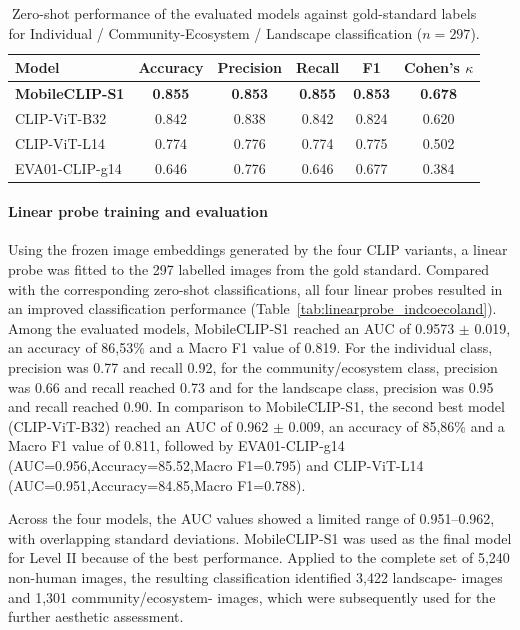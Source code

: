 \documentclass[11pt]{article}
\renewcommand{\_}{\textunderscore\allowbreak{}}
\begin{document}
\begin{table}[htbp]
\centering
\caption{Zero-shot performance of the evaluated models against gold-standard labels for Individual / Community-Ecosystem / Landscape classification ($n=297$).}
\label{tab:gold_standard_validation_indcoecoland}
\begin{tabular}{@{}lccccc@{}}
\toprule
\textbf{Model} & \textbf{Accuracy} & \textbf{Precision} & \textbf{Recall} & \textbf{F1} & \textbf{Cohen's $\kappa$} \\
\midrule
\textbf{MobileCLIP-S1}    & \textbf{0.855} & \textbf{0.853} & \textbf{0.855} & \textbf{0.853} & \textbf{0.678} \\
CLIP-ViT-B32               & 0.842 & 0.838 & 0.842 & 0.824 & 0.620 \\
CLIP-ViT-L14                & 0.774 & 0.776 & 0.774 & 0.775 & 0.502 \\
EVA01-CLIP-g14              & 0.646 & 0.776 & 0.646 & 0.677 & 0.384 \\
\bottomrule
\end{tabular}
\end{table}

\paragraph{Linear probe training and evaluation}
Using the frozen image embeddings generated by the four CLIP variants, a linear probe was fitted to the 297 labelled images from the gold standard. Compared with the corresponding zero-shot classifications, all four linear probes resulted in an improved classification performance (Table~\ref{tab:linearprobe_indcoecoland}). Among the evaluated models, MobileCLIP-S1 reached an AUC of 0.9573 $\pm$ 0.019, an accuracy of 86,53\% and a Macro F1 value of 0.819. For the individual class, precision was 0.77 and recall 0.92, for the community/ecosystem class, precision was 0.66 and recall reached 0.73 and for the landscape class, precision was 0.95 and recall reached 0.90. In comparison to MobileCLIP-S1, the second best model (CLIP-ViT-B32) reached an AUC of 0.962 $\pm$ 0.009, an accuracy of 85,86\% and a Macro F1 value of 0.811, followed by EVA01-CLIP-g14 (AUC=0.956,Accuracy=85.52,Macro F1=0.795) and CLIP-ViT-L14 (AUC=0.951,Accuracy=84.85,Macro F1=0.788). 

Across the four models, the AUC values showed a limited range of 0.951--0.962, with overlapping standard deviations. MobileCLIP-S1 was used as the final model for Level II because of the best performance. Applied to the complete set of 5,240 non-human images, the resulting classification identified 3,422 landscape- images and 1,301 community/ecosystem- images, which were subsequently used for the further aesthetic assessment.
\end{document}

